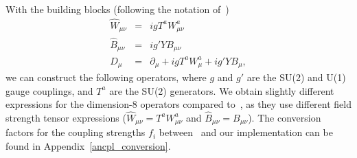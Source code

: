 \documentclass[english,12pt]{article}
\begin{document}
\vskip6pt
\noindent
With the building blocks (following the notation of~\cite{Hagiwara:1993qt,Hagiwara:1993ck})
\begin{eqnarray}
 \widehat{W}_{\mu\nu} &=& i g T^{a} W^{a}_{\mu\nu} \nonumber \\
 \widehat{B}_{\mu\nu} &=& i g' Y B_{\mu \nu} \nonumber \\
  D_\mu &=& \partial_\mu + i g T^{a} W^{a}_\mu  + i g' Y B_\mu,
\end{eqnarray}
we can construct the following operators, where $g$ and $g'$ are the SU(2) 
and U(1) gauge couplings, and $T^{a}$ are the SU(2) generators.
We obtain slightly different expressions for the dimension-8 operators compared to~\cite{Eboli:2006wa},
as they use different field strength tensor expressions ($\widehat{W}_{\mu\nu} = T^{a} W^{a}_{\mu\nu}$
and $\widehat{B}_{\mu\nu} = B_{\mu \nu}$). The conversion factors for the coupling
strengths $f_i$ between~\cite{Eboli:2006wa} and our implementation can be found in
Appendix~\ref{ancpl_conversion}.
\end{document}
